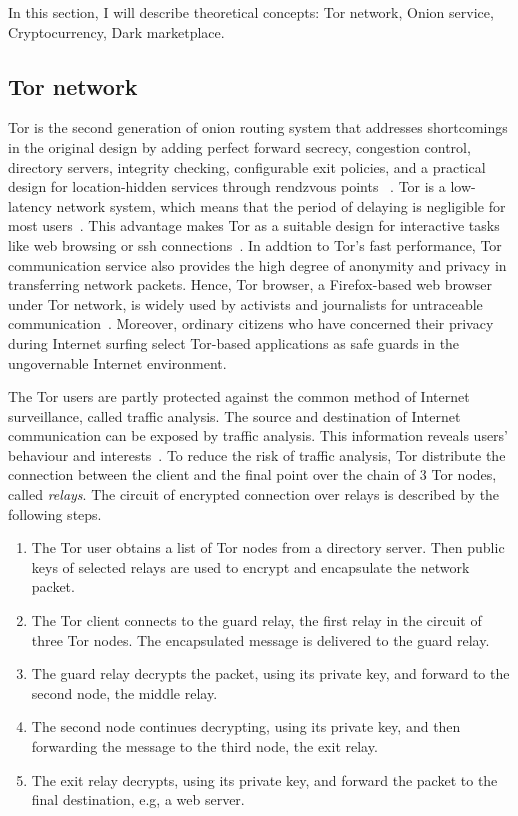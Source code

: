In this section, I will describe theoretical concepts: Tor network, Onion service,
Cryptocurrency, Dark marketplace.

\subsection{Tor network}
Tor is the second generation of onion routing system that addresses shortcomings
in the original design by adding perfect forward secrecy, congestion control,
directory servers, integrity checking, configurable exit policies, and a
practical design for location-hidden services through rendzvous points
~\cite{paper:tor_design}. Tor is a low-latency network system, which means that
the period of delaying is negligible for most users~\cite{report:overview_tor}.
This advantage makes Tor as a
suitable design for interactive tasks like web browsing or \acrshort{ssh}
connections~\cite{dis:usage_of_onion_services}. In addtion to Tor's fast performance,
Tor communication service also provides the high degree of anonymity and privacy
in transferring network packets. Hence, Tor browser, a Firefox-based web browser
under Tor network, is widely used by activists and journalists for untraceable
communication~\cite{dis:usage_of_onion_services}. Moreover, ordinary citizens who
have concerned their privacy during
Internet surfing select Tor-based applications as safe guards in the ungovernable
Internet environment.

The Tor users are partly protected against the common method of Internet surveillance, called traffic
analysis. The source and destination of Internet communication can be exposed by
traffic analysis. This information reveals users' behaviour and interests~\cite{web:onion_network}.
To reduce the risk of traffic analysis, Tor distribute the connection between the
client and the final point over the chain of 3 Tor nodes, called \emph{relays}.
The circuit of encrypted connection over relays is described by the following steps.
\begin{enumerate}
    \item The Tor user obtains a list of Tor nodes from a
    directory server. Then public keys of selected relays are used to encrypt and
    encapsulate the network packet.  
    \item The Tor client connects to the guard relay, the first relay in the circuit
    of three Tor nodes. The encapsulated message is delivered to the guard relay.
    \item The guard relay decrypts the packet, using its private key, 
    and forward to the second node, the middle relay.
    \item The second node continues decrypting, using its private key, and then
    forwarding the message to the third node, the exit relay.
    \item The exit relay decrypts, using its private key, and forward the packet
    to the final destination, e.g, a web server.
\end{enumerate}

